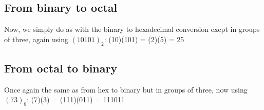 \documentclass{article}
\begin{document}
\subsection{From binary to octal}
Now, we simply do as with the binary to hexadecimal conversion exept in groups of three, again using $(10101)_2$:
(10)(101) = (2)(5) = 25

\subsection{From octal to binary}
Once again the same as from hex to binary but in groups of three, now using $(73)_8$:
(7)(3) = (111)(011) = 111011
\end{document}
